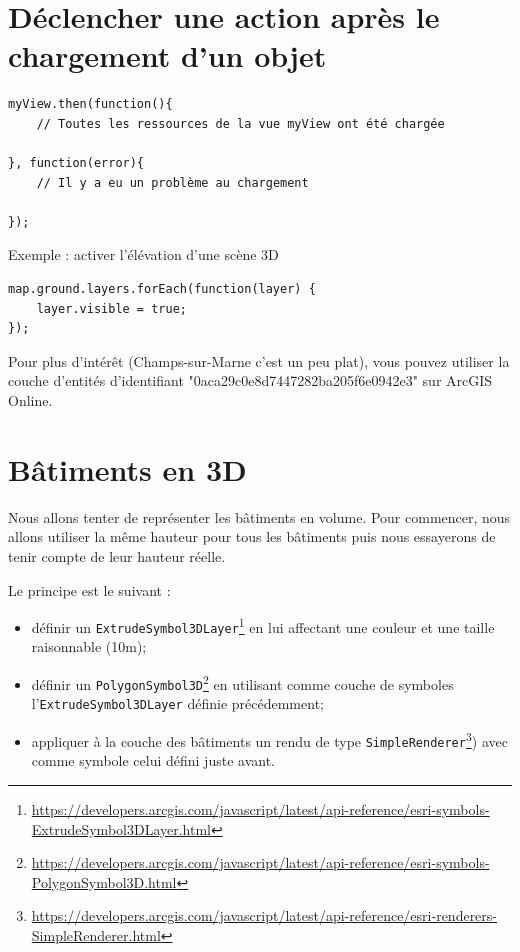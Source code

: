 \documentclass[11pt]{article}
\newcommand{\code}[1]{\lstinline{#1}}
\begin{document}
\section{Déclencher une action après le chargement d'un objet}

\begin{lstlisting}
myView.then(function(){
	// Toutes les ressources de la vue myView ont été chargée

}, function(error){
	// Il y a eu un problème au chargement

});
\end{lstlisting}

Exemple : activer l'élévation d'une scène 3D

\begin{lstlisting}
map.ground.layers.forEach(function(layer) {
	layer.visible = true;
});
\end{lstlisting}

Pour plus d'intérêt (Champs-sur-Marne c'est un peu plat), vous pouvez utiliser la couche d'entités d'identifiant "0aca29c0e8d7447282ba205f6e0942e3" sur ArcGIS Online.


\section{Bâtiments en 3D}
Nous allons tenter de représenter les bâtiments en volume. Pour commencer, nous allons utiliser la même hauteur pour tous les bâtiments puis nous essayerons de tenir compte de leur hauteur réelle.

Le principe est le suivant :
\begin{itemize}
	\item définir un \code{ExtrudeSymbol3DLayer}\footnote{\url{https://developers.arcgis.com/javascript/latest/api-reference/esri-symbols-ExtrudeSymbol3DLayer.html}} en lui affectant une couleur et une taille raisonnable (10m);
	\item définir un \code{PolygonSymbol3D}\footnote{\url{https://developers.arcgis.com/javascript/latest/api-reference/esri-symbols-PolygonSymbol3D.html}} en utilisant comme couche de symboles l'\code{ExtrudeSymbol3DLayer} définie précédemment;
	\item appliquer à la couche des bâtiments un rendu de type \code{SimpleRenderer}\footnote{\url{https://developers.arcgis.com/javascript/latest/api-reference/esri-renderers-SimpleRenderer.html}}) avec comme symbole celui défini juste avant.
\end{itemize}
\end{document}
